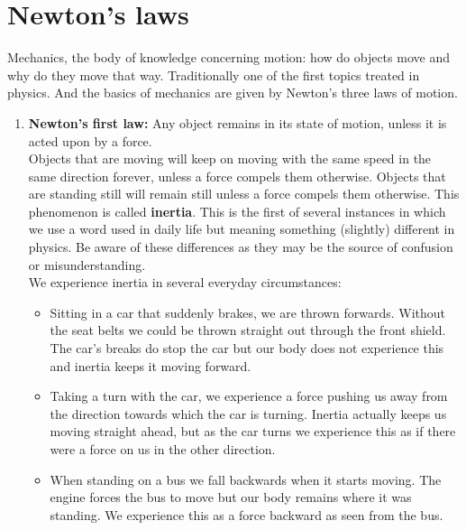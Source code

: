\section{Newton's laws}

\noindent Mechanics, the body of knowledge concerning motion: how do objects move and why do they move that way. Traditionally one of the first topics treated in physics. And the basics of mechanics are given by Newton's three laws of motion.

\begin{enumerate}

\item \textbf{Newton's first law:} Any object remains in its state of motion, unless it is acted upon by a force.\\

\noindent Objects that are moving will keep on moving with the same speed in the same direction forever, unless a force compels them otherwise. Objects that are standing still will remain still unless a force compels them otherwise. This phenomenon is called \textbf{inertia}. This is the first of several instances in which we use a word used in daily life but meaning something (slightly) different in physics. Be aware of these differences as they may be the source of confusion or misunderstanding.\\

\noindent We experience inertia in several everyday circumstances:
\begin{itemize}
\item Sitting in a car that suddenly brakes, we are thrown forwards. Without the seat belts we could be thrown straight out through the front shield. The car's breaks do stop the car but our body does not experience this and inertia keeps it moving forward.

\item Taking a turn with the car, we experience a force pushing us away from the direction towards which the car is turning. Inertia actually keeps us moving straight ahead, but as the car turns we experience this as if there were a force on us in the other direction. 

\item When standing on a bus we fall backwards when it starts moving. The engine forces the bus to move but our body remains where it was standing. We experience this as a force backward as seen from the bus.

\end{itemize}
 

\end{enumerate}
